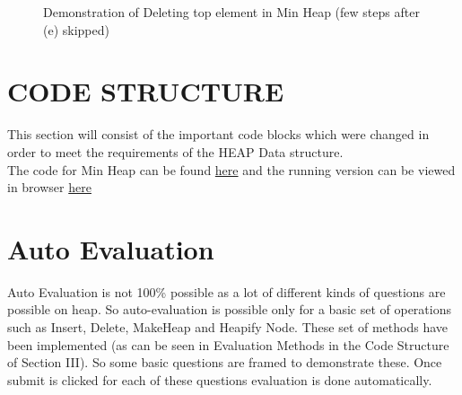 \documentclass[aps,letterpaper,12pt]{revtex4}
\begin{document}
\begin{figure}[H]
\caption{Demonstration of Deleting top element in Min Heap (few steps after (e) skipped)}
\label{fig:deletion}    
\end{figure}

\newpage
\section{CODE STRUCTURE}
This section will consist of the important code blocks which were changed in order to meet the requirements of the HEAP Data structure.\\
The code for Min Heap can be found \href{https://github.com/pranayhasan/designlab/}{here} and
the running version can be viewed in browser \href{https://rawgit.com/pranayhasan/designlab/master/Heap.html?scheme=1}{here}
\vspace{5mm}

\vspace{3mm}


\section{Auto Evaluation}
Auto Evaluation is not 100\% possible as a lot of different kinds of questions are possible on heap. So auto-evaluation is possible only for a basic set of operations such as Insert, Delete, MakeHeap and Heapify Node. These set of methods have been implemented (as can be seen in Evaluation Methods in the Code Structure of Section III). So some basic questions are framed to demonstrate these. Once submit is clicked for each of these questions evaluation is done automatically.\\
\end{document}
